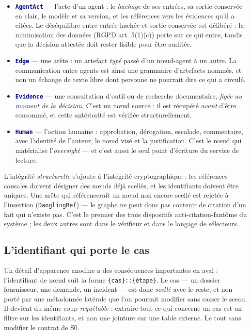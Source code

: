 \documentclass[10pt]{article}
\newcommand{\code}[1]{\texttt{\small #1}}
\newcommand{\mm}[1]{\textbf{\textcolor{navy}{#1}}}
\begin{document}
\begin{itemize}[leftmargin=13pt,itemsep=2.5pt,topsep=3pt]
\item \mm{\code{AgentAct}} — l'acte d'un agent : le \emph{hachage} de ses entrées, sa sortie conservée en clair, le modèle et sa version, et les références vers les évidences qu'il a citées. Le déséquilibre entre entrée hachée et sortie conservée est délibéré : la minimisation des données (RGPD art. 5(1)(c)) porte sur ce qui entre, tandis que la décision attestée doit rester lisible pour être auditée.
\item \mm{\code{Edge}} — une arête : un artefact \emph{typé} passé d'un nœud-agent à un autre. La communication entre agents est ainsi une grammaire d'artefacts nommés, et non un échange de texte libre dont personne ne pourrait dire ce qui a circulé.
\item \mm{\code{Evidence}} — une consultation d'outil ou de recherche documentaire, \emph{figée au moment de la décision}. C'est un nœud source : il est récupéré \emph{avant} d'être consommé, et cette antériorité est vérifiée structurellement.
\item \mm{\code{Human}} — l'action humaine : approbation, dérogation, escalade, commentaire, avec l'identité de l'auteur, le nœud visé et la justification. C'est le nœud qui matérialise l'\emph{oversight} — et c'est aussi le seul point d'écriture du service de lecture.
\end{itemize}

L'intégrité \emph{structurelle} s'ajoute à l'intégrité cryptographique : les références causales doivent désigner des nœuds déjà scellés, et les identifiants doivent être uniques. Une arête qui référencerait un nœud non encore scellé est rejetée à l'insertion (\code{DanglingRef}) — le graphe ne peut donc pas contenir de citation d'un fait qui n'existe pas. C'est le premier des trois dispositifs anti-citation-fantôme du système ; les deux autres sont dans le vérifieur et dans le langage de sélecteurs.

\subsection{L'identifiant qui porte le cas}

Un détail d'apparence anodine a des conséquences importantes en aval : l'identifiant de nœud suit la forme \code{\{cas\}::\{étape\}}. Le cas — un dossier fournisseur, une demande, un incident — est donc \emph{scellé} avec le reste, et non porté par une métadonnée latérale que l'on pourrait modifier sans casser le sceau. Il devient du même coup \emph{requêtable} : extraire tout ce qui concerne un cas est un filtre sur les identifiants, et non une jointure sur une table externe. Le tout sans modifier le contrat de S0.
\end{document}
